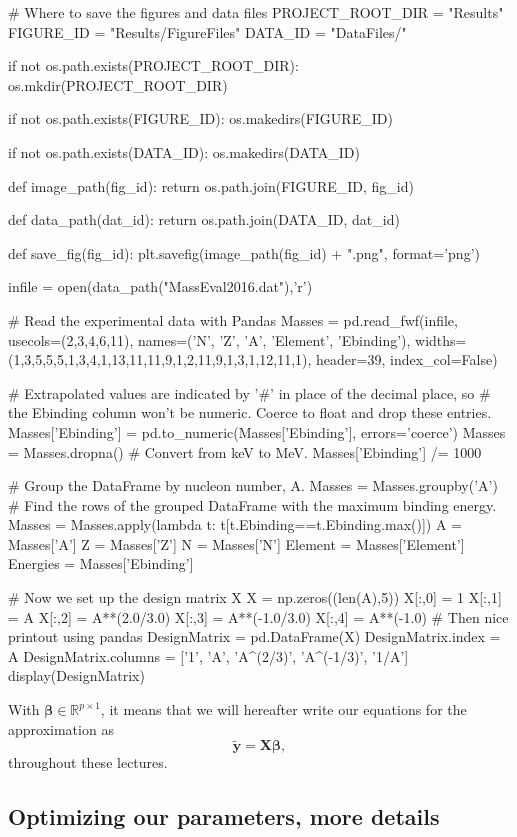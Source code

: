 \documentclass[%
oneside,                 %
final,                   %
10pt]{article}
\begin{document}
# Where to save the figures and data files
PROJECT_ROOT_DIR = "Results"
FIGURE_ID = "Results/FigureFiles"
DATA_ID = "DataFiles/"

if not os.path.exists(PROJECT_ROOT_DIR):
    os.mkdir(PROJECT_ROOT_DIR)

if not os.path.exists(FIGURE_ID):
    os.makedirs(FIGURE_ID)

if not os.path.exists(DATA_ID):
    os.makedirs(DATA_ID)

def image_path(fig_id):
    return os.path.join(FIGURE_ID, fig_id)

def data_path(dat_id):
    return os.path.join(DATA_ID, dat_id)

def save_fig(fig_id):
    plt.savefig(image_path(fig_id) + ".png", format='png')

infile = open(data_path("MassEval2016.dat"),'r')


# Read the experimental data with Pandas
Masses = pd.read_fwf(infile, usecols=(2,3,4,6,11),
              names=('N', 'Z', 'A', 'Element', 'Ebinding'),
              widths=(1,3,5,5,5,1,3,4,1,13,11,11,9,1,2,11,9,1,3,1,12,11,1),
              header=39,
              index_col=False)

# Extrapolated values are indicated by '#' in place of the decimal place, so
# the Ebinding column won't be numeric. Coerce to float and drop these entries.
Masses['Ebinding'] = pd.to_numeric(Masses['Ebinding'], errors='coerce')
Masses = Masses.dropna()
# Convert from keV to MeV.
Masses['Ebinding'] /= 1000

# Group the DataFrame by nucleon number, A.
Masses = Masses.groupby('A')
# Find the rows of the grouped DataFrame with the maximum binding energy.
Masses = Masses.apply(lambda t: t[t.Ebinding==t.Ebinding.max()])
A = Masses['A']
Z = Masses['Z']
N = Masses['N']
Element = Masses['Element']
Energies = Masses['Ebinding']

# Now we set up the design matrix X
X = np.zeros((len(A),5))
X[:,0] = 1
X[:,1] = A
X[:,2] = A**(2.0/3.0)
X[:,3] = A**(-1.0/3.0)
X[:,4] = A**(-1.0)
# Then nice printout using pandas
DesignMatrix = pd.DataFrame(X)
DesignMatrix.index = A
DesignMatrix.columns = ['1', 'A', 'A^(2/3)', 'A^(-1/3)', '1/A']
display(DesignMatrix)
\epycod

With $\bm{\beta}\in {\mathbb{R}}^{p\times 1}$, it means that we will hereafter write our equations for the approximation as
\[
\bm{\tilde{y}}= \bm{X}\bm{\beta},
\]
throughout these lectures. 


\subsection{Optimizing our parameters, more details}
\end{document}
